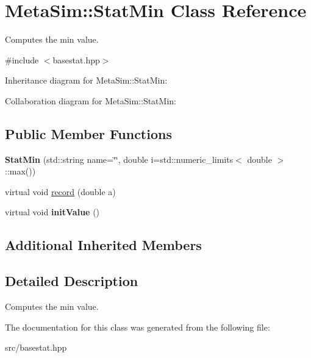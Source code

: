 \hypertarget{classMetaSim_1_1StatMin}{}\section{Meta\+Sim\+:\+:Stat\+Min Class Reference}
\label{classMetaSim_1_1StatMin}


Computes the min value.  




{\ttfamily \#include $<$basestat.\+hpp$>$}



Inheritance diagram for Meta\+Sim\+:\+:Stat\+Min\+:


Collaboration diagram for Meta\+Sim\+:\+:Stat\+Min\+:
\subsection*{Public Member Functions}
\begin{DoxyCompactItemize}
\item 
{\bfseries Stat\+Min} (std\+::string name=\char`\"{}\char`\"{}, double i=std\+::numeric\+\_\+limits$<$ double $>$\+::max())
\item 
virtual void \hyperlink{group__metasim__stat_ga420e16228992c9fb54a7a3264e4f87f5}{record} (double a)
\item 
virtual void {\bfseries init\+Value} ()
\end{DoxyCompactItemize}
\subsection*{Additional Inherited Members}


\subsection{Detailed Description}
Computes the min value. 

The documentation for this class was generated from the following file\+:\begin{DoxyCompactItemize}
\item 
src/basestat.\+hpp\end{DoxyCompactItemize}
